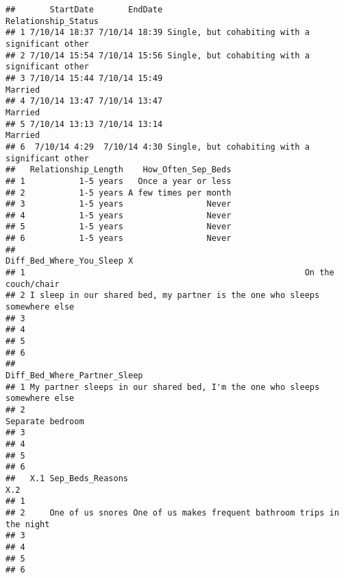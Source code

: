 \documentclass[
]{article}
\begin{document}
\begin{verbatim}
##       StartDate       EndDate                             Relationship_Status
## 1 7/10/14 18:37 7/10/14 18:39 Single, but cohabiting with a significant other
## 2 7/10/14 15:54 7/10/14 15:56 Single, but cohabiting with a significant other
## 3 7/10/14 15:44 7/10/14 15:49                                         Married
## 4 7/10/14 13:47 7/10/14 13:47                                         Married
## 5 7/10/14 13:13 7/10/14 13:14                                         Married
## 6  7/10/14 4:29  7/10/14 4:30 Single, but cohabiting with a significant other
##   Relationship_Length    How_Often_Sep_Beds
## 1           1-5 years   Once a year or less
## 2           1-5 years A few times per month
## 3           1-5 years                 Never
## 4           1-5 years                 Never
## 5           1-5 years                 Never
## 6           1-5 years                 Never
##                                                     Diff_Bed_Where_You_Sleep X
## 1                                                         On the couch/chair  
## 2 I sleep in our shared bed, my partner is the one who sleeps somewhere else  
## 3                                                                             
## 4                                                                             
## 5                                                                             
## 6                                                                             
##                                                 Diff_Bed_Where_Partner_Sleep
## 1 My partner sleeps in our shared bed, I'm the one who sleeps somewhere else
## 2                                                           Separate bedroom
## 3                                                                           
## 4                                                                           
## 5                                                                           
## 6                                                                           
##   X.1 Sep_Beds_Reasons                                                  X.2
## 1                                                                          
## 2     One of us snores One of us makes frequent bathroom trips in the night
## 3                                                                          
## 4                                                                          
## 5                                                                          
## 6                                                                          

\end{verbatim}
\end{document}
